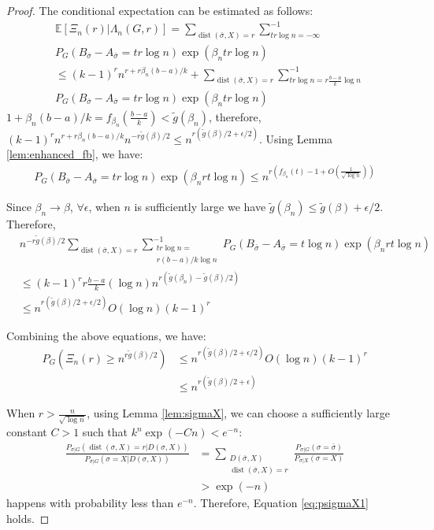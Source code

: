 \documentclass[entropy,article,accept,moreauthors,pdftex]{Definitions/mdpi}
\newcommand{\1}{\mathbbm{1}}
\DeclareMathOperator{\Dist}{dist}
\begin{document}
\begin{paracol}{2}
\begin{proof}
The conditional expectation can be estimated as follows:
\begin{align*}
&\mathbb{E}[\Xi_n(r)|\Lambda_n(G,r)]=
\sum_{\Dist(\bar{\sigma}, X) = r}\sum_{tr\log n = -\infty }^{-1} \\
& P_G(B_{\bar{\sigma}} -A_{\bar{\sigma}}=tr\log n)\exp(\beta_n tr \log n) \\
& \leq (k-1)^r n^{r+r\beta_n(b-a)/k} +
\sum_{\Dist(\bar{\sigma}, X) = r}\sum_{tr\log n = r\frac{b-a}{k}\log n }^{-1} \\
& P_G(B_{\bar{\sigma}} -A_{\bar{\sigma}}=tr\log n)\exp(\beta_n tr \log n)
\end{align*}
$1+\beta_n(b-a)/k = f_{\beta_n}(\frac{b-a}{k}) < \tilde{g}(\beta_n)$, therefore,
$(k-1)^r n^{r+r\beta_n (b-a)/k}n^{-r \tilde{g}(\beta) /2} \leq$\linebreak $n^{r (\tilde{g}(\beta) /2 + \epsilon/2)} $.
Using Lemma \ref{lem:enhanced_fb}, we have:
\begin{align*}
P_G(B_{\bar{\sigma}} -A_{\bar{\sigma}}=tr\log n)\exp(\beta_n rt \log n) \leq 
n^{r(f_{\beta_n}(t)-1 + O(\frac{1}{\sqrt{\log n}}))}
\end{align*}

Since $\beta_n \to \beta$, $\forall \epsilon$, when $n$ is sufficiently large
we have $\tilde{g}(\beta_n) \leq \tilde{g}(\beta) + \epsilon /2$.
Therefore,
\begin{align*}
&n^{-r \tilde{g}(\beta) /2}\sum_{\Dist(\bar{\sigma}, X) = r}\sum_{\substack{tr\log n = \\ r(b-a)/k\log n} }^{-1}
P_G(B_{\bar{\sigma}} -A_{\bar{\sigma}}=t\log n)\exp(\beta_n rt \log n) \\
& \leq  (k-1)^r r\frac{b-a}{k} ( \log n ) n^{r(\tilde{g}(\beta_n) - \tilde{g}(\beta)/2)}\\
& \leq  n^{r(\tilde{g}(\beta)/2 + \epsilon/2)} O(\log n) (k-1)^r
\end{align*}

Combining the above equations, we have:
\begin{align*}
P_{G}(\Xi_n(r) \geq n^{r \tilde{g}(\beta) /2}) &\leq  n^{r(\tilde{g}(\beta)/2 + \epsilon/2)} O(\log n) (k-1)^r\\
&\leq n^{r(\tilde{g}(\beta)/2 + \epsilon)}
\end{align*}

When $r>\frac{n}{\sqrt{\log n}}$, using Lemma \ref{lem:sigmaX}, we can choose a sufficiently large constant $C>1$
such that $k^n\exp(-Cn) < e^{-n}$:
\begin{align*}
\frac{P_{\sigma|G}(\Dist(\sigma, X)=r | D(\sigma, X))}
{P_{\sigma|G}(\sigma=X | D(\sigma, X))} &= \sum_{\substack{D(\bar{\sigma}, X) \\ \Dist(\bar{\sigma}, X)=r}}
\frac{P_{\sigma | G}(\sigma = \bar{\sigma}) }{P_{\sigma | X}(\sigma = X)} \\
&> \exp(-n)
\end{align*}
happens with probability less than $e^{-n}$. Therefore,  Equation \eqref{eq:psigmaX1} holds.
\end{proof}


\end{paracol}
\end{document}
